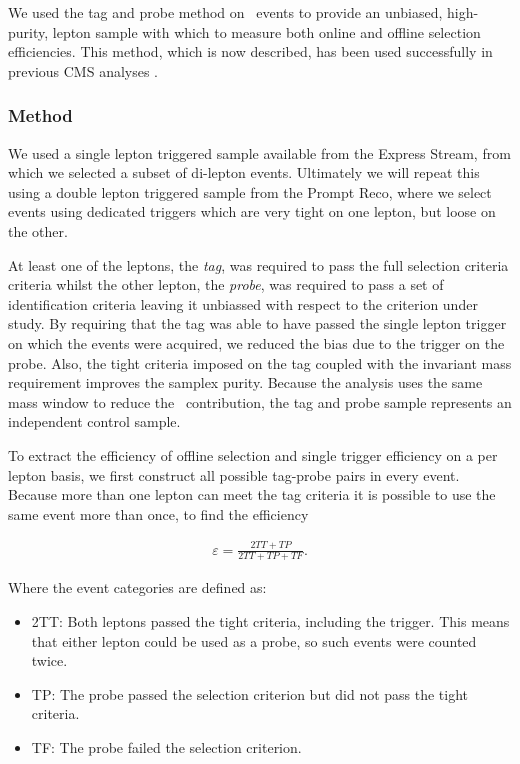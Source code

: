  
We used the tag and probe method on \dyll~events to provide an unbiased, high-purity, 
lepton sample with which to measure both online and offline selection efficiencies.
This method, which is now described, 
has been used successfully in previous CMS analyses \cite{ref:tagprobe_mit_w}\cite{ref:tagprobe_snt_top}.

\subsubsection{Method}
We used a single lepton triggered sample available from the Express Stream, 
from which we selected a subset of di-lepton events.
Ultimately we will repeat this using a double lepton triggered sample from the Prompt Reco,
where we select events using dedicated triggers which are very tight on one lepton,
but loose on the other.

At least one of the leptons, the {\it tag}, was required to pass the full selection criteria criteria 
whilst the other lepton, the {\it probe}, was required to pass a set of identification criteria leaving 
it unbiassed with respect to the criterion under study. 
By requiring that the tag was able to have passed the single lepton trigger on which the events were acquired, 
we reduced the bias due to the trigger on the probe.
Also, the tight criteria imposed on the tag coupled with the invariant mass requirement improves the samplex purity.
Because the analysis uses the same mass window to reduce the \dyll~contribution, 
the tag and probe sample represents an independent control sample.

To extract the efficiency of offline selection and single trigger efficiency on a per lepton basis, 
we first construct all possible tag-probe pairs in every event.
Because more than one lepton can meet the tag criteria it is possible to use the same event more than once, to find the efficiency

\begin{eqnarray}
\label{eqn:tagAndProbeEfficiencyEqn}
\varepsilon = \frac{2TT + TP}{2TT + TP + TF}.
\end{eqnarray}

Where the event categories are defined as:

\begin{itemize}
	\item 2TT: Both leptons passed the tight criteria, including the trigger. This means that either lepton could be used as a probe, 
	so such events were counted twice.
	\item TP: The probe passed the selection criterion but did not pass the tight criteria.
	\item TF: The probe failed the selection criterion.
\end{itemize}

